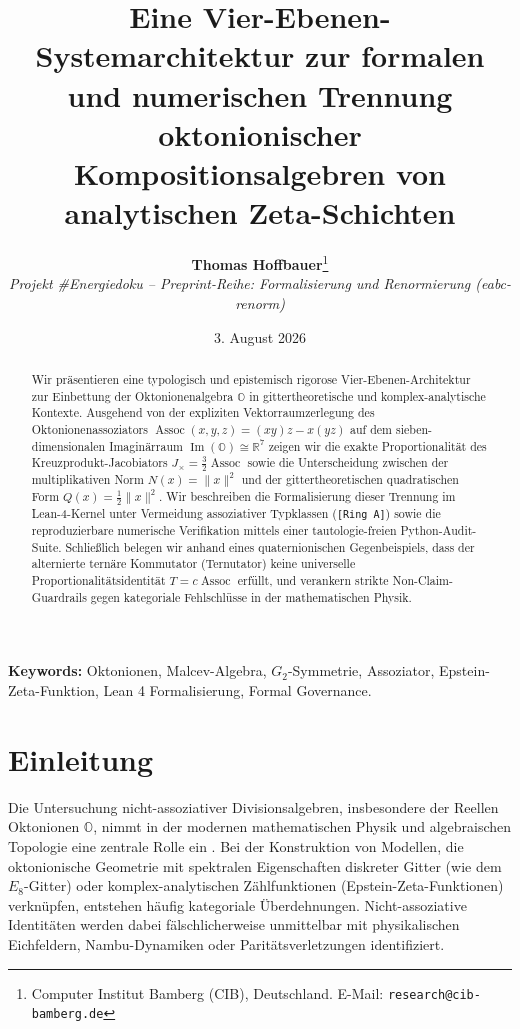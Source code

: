 \documentclass[11pt,a4paper]{article}
\title{\textbf{Eine Vier-Ebenen-Systemarchitektur zur formalen und numerischen Trennung oktonionischer Kompositionsalgebren von analytischen Zeta-Schichten}}
\author{%
	\textbf{Thomas Hoffbauer}\thanks{Computer Institut Bamberg (CIB), Deutschland. E-Mail: \texttt{research@cib-bamberg.de}} \\[2mm]
	\small\textit{Projekt \#Energiedoku -- Preprint-Reihe: Formalisierung und Renormierung (eabc-renorm)}
}
\date{3. August 2026}
\theoremstyle{definition}
\newcommand{\Oalg}{\mathbb{O}}
\newcommand{\ImO}{\operatorname{Im}(\mathbb{O})}
\newcommand{\Assoc}{\operatorname{Assoc}}
\begin{document}
	
	\maketitle
	
	\begin{abstract}
		Wir präsentieren eine typologisch und epistemisch rigorose Vier-Ebenen-Architektur zur Einbettung der Oktonionenalgebra $\Oalg$ in gittertheoretische und komplex-analytische Kontexte. Ausgehend von der expliziten Vektorraumzerlegung des Oktonionenassoziators $\Assoc(x,y,z) = (xy)z - x(yz)$ auf dem sieben-dimensionalen Imaginärraum $\ImO \cong \mathbb{R}^7$ zeigen wir die exakte Proportionalität des Kreuzprodukt-Jacobiators $J_\times = \frac{3}{2}\Assoc$ sowie die Unterscheidung zwischen der multiplikativen Norm $N(x) = \|x\|^2$ und der gittertheoretischen quadratischen Form $Q(x) = \frac{1}{2}\|x\|^2$. Wir beschreiben die Formalisierung dieser Trennung im Lean-4-Kernel unter Vermeidung assoziativer Typklassen (\texttt{[Ring A]}) sowie die reproduzierbare numerische Verifikation mittels einer tautologie-freien Python-Audit-Suite. Schließlich belegen wir anhand eines quaternionischen Gegenbeispiels, dass der alternierte ternäre Kommutator (Ternutator) keine universelle Proportionalitätsidentität $T = c \Assoc$ erfüllt, und verankern strikte Non-Claim-Guardrails gegen kategoriale Fehlschlüsse in der mathematischen Physik.
	\end{abstract}
	
	\noindent\textbf{Keywords:} Oktonionen, Malcev-Algebra, $G_2$-Symmetrie, Assoziator, Epstein-Zeta-Funktion, Lean 4 Formalisierung, Formal Governance.
	
	\section{Einleitung}
	
	Die Untersuchung nicht-assoziativer Divisionsalgebren, insbesondere der Reellen Oktonionen $\Oalg$, nimmt in der modernen mathematischen Physik und algebraischen Topologie eine zentrale Rolle ein \cite{baez2002octonions}. Bei der Konstruktion von Modellen, die oktonionische Geometrie mit spektralen Eigenschaften diskreter Gitter (wie dem $E_8$-Gitter) oder komplex-analytischen Zählfunktionen (Epstein-Zeta-Funktionen) verknüpfen, entstehen häufig kategoriale Überdehnungen. Nicht-assoziative Identitäten werden dabei fälschlicherweise unmittelbar mit physikalischen Eichfeldern, Nambu-Dynamiken oder Paritätsverletzungen identifiziert.
	
\end{document}
